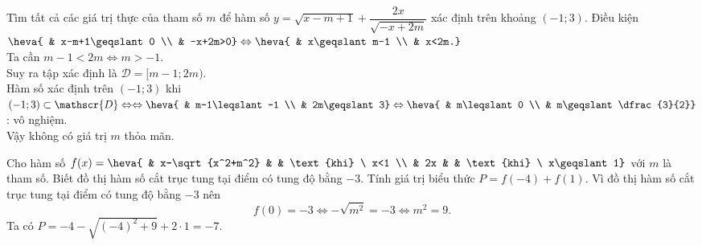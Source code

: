 \begin{vd}%
	Tìm tất cả các giá trị thực của tham số $m$ để hàm số $ y=\sqrt{x-m+1}+\dfrac{2x}{\sqrt{-x+2m}}$ xác định trên khoảng $(-1;3)$.
	\loigiai
	{
	Điều kiện $\heva{ & x-m+1\geqslant0 \\ & -x+2m>0} \Leftrightarrow \heva{ & x\geqslant m-1 \\ & x<2m.}$ \\
	Ta cần $m-1<2m \Leftrightarrow m>-1$. \\
	Suy ra tập xác định là $\mathscr{D}=[m-1;2m)$. \\
	Hàm số xác định trên $(-1;3)$ khi $(-1;3)\subset\mathscr{D} \Leftrightarrow \Leftrightarrow \heva{ & m-1\leqslant-1 \\ & 2m\geqslant3} \Leftrightarrow \heva{ & m\leqslant0 \\ & m\geqslant\dfrac{3}{2}}$: vô nghiệm. \\
	Vậy không có giá trị $m$ thỏa mãn.
	}
\end{vd}

\begin{vd}%
	Cho hàm số $f(x)=\heva{ & x-\sqrt{x^2+m^2} & & \text{khi} \ x<1 \\ & 2x & & \text{khi} \ x\geqslant1}$ với $m$ là tham số. Biết đồ thị hàm số cắt trục tung tại điểm có tung độ bằng $-3$. Tính giá trị biểu thức $P=f(-4)+f(1)$.
	\loigiai
	{
		Vì đồ thị hàm số cắt trục tung tại điểm có tung độ bằng $-3$ nên
		\[f(0)=-3 \Leftrightarrow -\sqrt{m^2}=-3 \Leftrightarrow m^2=9.\]
		Ta có $P=-4-\sqrt{\left(-4\right)^2+9}+2\cdot1=-7$.
	}
\end{vd}

\baitaptl

